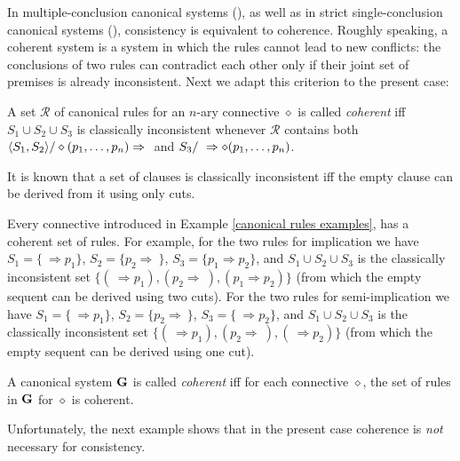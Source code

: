 \documentclass{LMCS}
\theoremstyle{remark}
\newcommand{\G}{{\bf G}}
\newcommand{\dd}{\diamond}
\newcommand{\ptil}{p_1 \til p_n}
\newcommand{\Ra}{\Rightarrow}
\newcommand{\tup}[1]{\langle #1 \rangle}
\begin{document}
In multiple-conclusion canonical systems (\cite{AL05}), as well as in strict
single-conclusion  canonical systems (\cite{AL10}), consistency is equivalent to
coherence. Roughly speaking, a coherent system is a system in
which the rules cannot lead to new conflicts: the conclusions of
two rules can contradict each other only if their joint set of
premises is already inconsistent.  Next we
adapt this criterion to the present case:

\begin{defi}
\label{coherent-connective}
A set ${\mathcal{R}}$ of canonical rules for an $n$-ary connective $\dd$
is called {\em coherent} iff 
$S_1\cup S_2\cup S_3$ is classically inconsistent
whenever ${\mathcal{R}}$ contains 
both $\tup{S_1,S_2}/\dd(\ptil) \Ra \ $
and $S_3/\ \Ra \dd(\ptil)$. 
\end{defi}

\begin{rem}
It is known that a set of clauses is classically inconsistent
iff the empty clause can be derived from it using only cuts.
\end{rem}

\begin{exa}
Every connective introduced in Example \ref{canonical rules examples}, has a coherent set of rules.
For example, for the two rules
for implication we have $S_1=\{\ \Ra p_1\}$, $S_2=\{p_2\Ra\ \}$,
$S_3=\{p_1\Ra p_2\}$, and
$S_1\cup S_2\cup S_3$ is the classically inconsistent set
${\{(\ \Ra p_1) , (p_2\Ra\ ), (p_1\Ra p_2)\}}$ 
(from which the empty sequent can be derived using two cuts). 
For the two rules
for semi-implication we have $S_1=\{\ \Ra p_1\}$, $S_2=\{p_2\Ra\ \}$,
$S_3=\{\ \Ra p_2\}$, and
$S_1\cup S_2\cup S_3$ is the classically inconsistent set
${\{(\ \Ra p_1) , (p_2\Ra\ ), (\ \Ra p_2)\}}$ 
(from which the empty sequent can be derived using one cut). 
\end{exa}

\begin{defi}
\label{coherence}
A canonical system ${\G}$ 
is called {\em coherent} iff for each connective $\diamond$, the 
set of rules in $\G$ for $\diamond$ is coherent.
\end{defi}

Unfortunately, the next example shows that
in the present case coherence is {\em not}  necessary for consistency.
\end{document}

